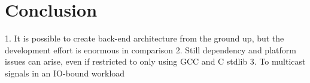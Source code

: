 \section{Conclusion}
1. It is possible to create back-end architecture from the ground up, but the development effort is enormous in comparison 
2. Still dependency and platform issues can arise, even if restricted to only using GCC and C stdlib
3. To multicast signals in an IO-bound workload 